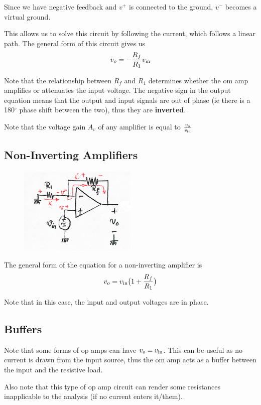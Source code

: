 \documentclass[12pt]{article}
\begin{document}
Since we have negative feedback and $v^+$ is connected to the ground, $v^-$ becomes a virtual ground.

This allows us to solve this circuit by following the current, which follows a linear path. The general form of this circuit gives us \[ v_o = -\frac{R_f}{R_1}v_{{\rm in}} \]

Note that the relationship between $R_f$ and $R_1$ determines whether the om amp amplifies or attenuates the input voltage. The negative sign in the output equation means that the output and input signals are out of phase (ie there is a 180$^\circ$ phase shift between the two), thus they are {\bf inverted}.

Note that the voltage gain $A_v$ of any amplifier is equal to $\frac{v_o}{v_{{\rm in}}}$

\subsection*{Non-Inverting Amplifiers}

\begin{figure}[ht]
\centering
\includegraphics[width=0.5\textwidth]{noninvertingamp.png}
\end{figure}

The general form of the equation for a non-inverting amplifier is \[ v_o = v_{{\rm in}} \bigl(1 + \frac{R_f}{R_1}\bigl) \]

Note that in this case, the input and output voltages are in phase.

\subsection*{Buffers}
Note that some forms of op amps can have $v_o = v_{{\rm in}}$. This can be useful as no current is drawn from the input source, thus the om amp acts as a buffer between the input and the resistive load.

Also note that this type of op amp circuit can render some resistances inapplicable to the analysis (if no current enters it/them).
\end{document}
